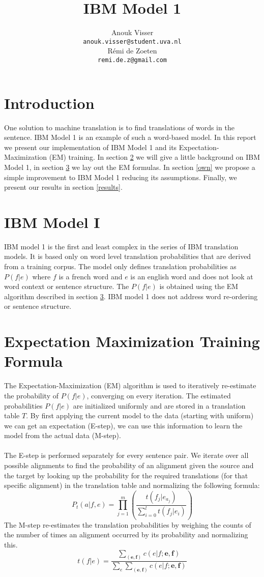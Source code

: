 \documentclass[11pt]{article}
\title{IBM Model 1}
\author{Anouk Visser \\
  {\tt anouk.visser@student.uva.nl} \\\And
  R\'emi de Zoeten \\
  {\tt remi.de.z@gmail.com} \\}
\date{}
\begin{document}
\maketitle

\section{Introduction}
One solution to machine translation is to find translations of words in the sentence. IBM Model 1 \cite{IBM} is an example of such a word-based model. In this report we present our implementation of IBM Model 1 and its Expectation-Maximization (EM) training. In section \ref{IBM} we will give a little background on IBM Model 1, in section \ref{em} we lay out the EM formulas. In section \ref{own} we propose a simple improvement to IBM Model 1 reducing its assumptions. Finally, we present our results in section \ref{results}.


\section{IBM Model I}
\label{IBM}
IBM model 1 is the first and least complex in the series of IBM translation models. It is based only on word level translation probabilities that are derived from a training corpus. The model only defines translation probabilities as $P(f|e)$ where $f$ is a french word and $e$ is an english word and does not look at word context or sentence structure. The $P(f|e)$ is obtained using the EM algorithm described in section \ref{em}. IBM model 1 does not address word re-ordering or sentence structure.

\section{Expectation Maximization Training Formula}
\label{em}
The Expectation-Maximization (EM) algorithm is used to iteratively re-estimate the probability of $P(f|e)$, converging on every iteration. The estimated probabilities $P(f|e)$ are initialized uniformly and are stored in a translation table $T$. By first applying the current model to the data (starting with uniform) we can get an expectation (E-step), we can use this information to learn the model from the actual data (M-step).\\\\
The E-step is performed separately for every sentence pair. We iterate over all possible alignments to find the probability of an alignment given the source and the target by looking up the probability for the required translations (for that specific alignment) in the translation table and normalizing the following formula: 
$$P_t(a|f, e) = \prod\limits_{j=1}^{m} (\frac{t(f_j|e_{a_{j}})}{\sum\limits_{i=0}^{l}t(f_j|e_i)})$$
The M-step re-estimates the translation probabilities by weighing the counts of the number of times an alignment occurred by its probability and normalizing this. 
$$t(f|e) = \frac{\sum\limits_{(\textbf{e}, \textbf{f})} c(e|f; \textbf{e}, \textbf{f})}{\sum\limits_{e}\sum\limits_{(\textbf{e}, \textbf{f})} c(e|f; \textbf{e}, \textbf{f})}$$
\end{document}
